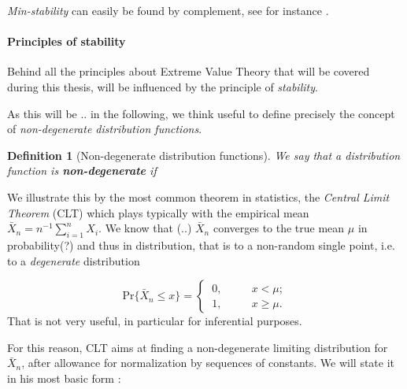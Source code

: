 \documentclass[11pt,a4paper,openany ]{book}
\newtheorem{definition}{Definition}[chapter]
\begin{document}
\emph{Min-stability} can easily be found by complement, see for instance \citet[pp.23]{ reiss_statistical_2007}.

\paragraph{Principles of stability}
Behind all the principles about Extreme Value Theory that will be covered during this thesis, will be influenced by the principle of \emph{stability}.
\newline

As this will be .. in the following, we think useful to define precisely the concept of \emph{non-degenerate distribution functions}.
\begin{definition}[Non-degenerate distribution functions]
	We say that a distribution function is \emph{\textbf{non-degenerate}} if 
\end{definition}

We illustrate this by the most common theorem in statistics, the \emph{Central Limit Theorem} (CLT) which plays typically with the empirical mean $\bar{X}_n=n^{-1}\sum_{i=1}^nX_i$. We know that (..) $\bar{X}_n$ converges to the true mean $\mu$ in probability(?) and thus in distribution, that is to a non-random single point, i.e. to a \emph{degenerate} distribution 

\begin{equation*}
\text{Pr}\big\{\bar{X}_n\leq x\big\}= \begin{cases}
\ 0, \ \ \ \ \ \ \ \ \ \ \ \ x<\mu; \\
\ 1, \ \ \ \  \ \ \ \ \ \ \ \ x\geq \mu. 
\end{cases}
\end{equation*}
That is not very useful, in particular for inferential purposes.

For this reason, CLT aims at finding a non-degenerate limiting distribution for $\bar{X}_n$, after allowance for normalization by sequences of constants. We will state it in his most basic form :
\end{document}
